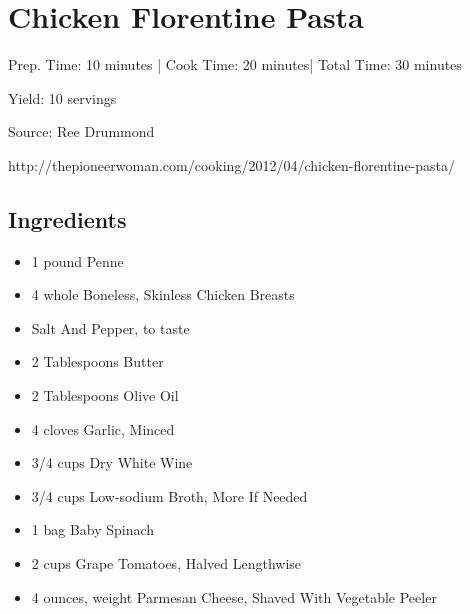\section{Chicken Florentine Pasta}

\begin{center}
Prep. Time: 10 minutes |
Cook Time: 20 minutes|
Total Time: 30 minutes
 
Yield: 10 servings

\vspace{1em}

Source: Ree Drummond\par
http://thepioneerwoman.com/cooking/2012/04/chicken-florentine-pasta/
\end{center}

\subsection{Ingredients}
\begin{itemize}
    \item 1 pound Penne
    \item 4 whole Boneless, Skinless Chicken Breasts
    \item Salt And Pepper, to taste
    \item 2 Tablespoons Butter
    \item 2 Tablespoons Olive Oil
    \item 4 cloves Garlic, Minced
    \item 3/4 cups Dry White Wine
    \item 3/4 cups Low-sodium Broth, More If Needed
    \item 1 bag Baby Spinach
    \item 2 cups Grape Tomatoes, Halved Lengthwise
    \item 4 ounces, weight Parmesan Cheese, Shaved With Vegetable Peeler
\end{itemize}

